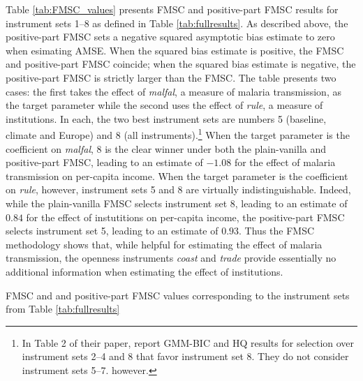 Table \ref{tab:FMSC_values} presents FMSC and positive-part FMSC results for instrument sets 1--8  as defined in Table \ref{tab:fullresults}. 
As described above, the positive-part FMSC sets a negative squared asymptotic bias estimate to zero when esimating AMSE.
When the squared bias estimate is positive, the FMSC and positive-part FMSC coincide; when the squared bias estimate is negative, the positive-part FMSC is strictly larger than the FMSC. 
The table presents two cases: the first takes the effect of \emph{malfal}, a measure of malaria transmission, as the target parameter while the second uses the effect of \emph{rule}, a measure of institutions. 
In each, the two best instrument sets are numbers 5 (baseline, climate and Europe) and 8 (all instruments).\footnote{In Table 2 of their paper, \cite{Carstensen2006} report GMM-BIC and HQ results for selection over instrument sets 2--4 and 8 that favor instrument set 8. They do not consider instrument sets 5--7. however.}
When the target parameter is the coefficient on \emph{malfal}, 8 is the clear winner under both the plain-vanilla and positive-part FMSC, leading to an estimate of $-1.08$ for the effect of malaria transmission on per-capita income.
When the target parameter is the coefficient on \emph{rule}, however, instrument sets 5 and 8 are virtually indistinguishable.
Indeed, while the plain-vanilla FMSC selects instrument set 8, leading to an estimate of $0.84$ for the effect of instutitions on per-capita income, the positive-part FMSC selects instrument set 5, leading to an estimate of $0.93$. 
Thus the FMSC methodology shows that, while helpful for estimating the effect of malaria transmission, the openness instruments \emph{coast} and \emph{trade} provide essentially no additional information when estimating the effect of institutions.
 
\begin{table}[htbp]
	\centering
	
		\caption{FMSC and and positive-part FMSC values corresponding to the instrument sets from Table \ref{tab:fullresults}}
		\label{tab:FMSC_values}
\end{table}

